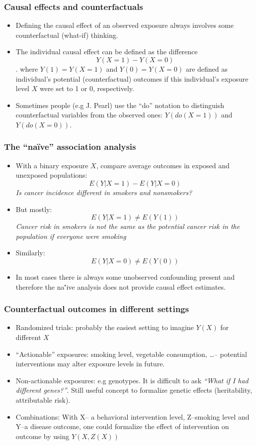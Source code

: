 \documentclass{beamer}
\begin{document}
\begin{frame}
\frametitle{Causal effects and counterfactuals}
\begin{itemize}
\item Defining the causal effect of an observed exposure always involves some \alert<1>{counterfactual} (what-if) thinking.
\item The individual causal effect can be defined as the difference 
 \[Y(X=1) - Y(X=0)\].
where $Y(1)=Y(X=1)$ and $Y(0)=Y(X=0)$ are defined as individual's \alert<2>{potential (counterfactual)} outcomes if this individual's exposure level $X$ were \alert<2>{set} to 1 or 0, respectively. 
\item Sometimes people (e.g J. Pearl) use the \alert<3>{``do''} notation to distinguish counterfactual variables from the observed ones: $Y(do(X=1))$ and $Y(do(X=0))$.     
\end{itemize}
\end{frame}

\begin{frame}
  \frametitle{The ``na\"ive'' association analysis}
  {\small  \begin{itemize}
  \item With a binary exposure $X$, compare average outcomes in exposed and unexposed populations:
  \[E(Y|X=1) - E(Y|X=0)\]
  \textit{Is cancer incidence different in smokers and nonsmokers?}
  \item But mostly:
  \[E(Y|X=1) \ne E(Y(1))\]
  \textit{Cancer risk in smokers is not the same as the potential cancer risk in the population if everyone were smoking}
  \item Similarly:
  \[E(Y|X=0) \ne E(Y(0))\]
  \item In most cases there is always some \alert{unobserved confounding} present and therefore the
   na\''ive analysis does not provide causal effect estimates.  
  \end{itemize}}
\end{frame}

\begin{frame}
\frametitle{Counterfactual outcomes in different settings}
\begin{itemize}
\item \alert<1>{Randomized trials}: probably the easiest setting to imagine $Y(X)$ for different $X$
\item \alert<2>{``Actionable'' exposures}: smoking level, vegetable consumption, \ldots -- potential interventions may alter exposure levels in future.
\item \alert<3>{Non-actionable exposures}: e.g genotypes. It is difficult to ask \emph{``What if I had different genes?''}. Still useful concept to formalize genetic effects (heritability, attributable risk).
\item \alert<4>{Combinations}: With X-- a behavioral intervention level, Z--smoking level and Y--a disease outcome, one could formalize the effect of intervention on outcome by using $Y(X, Z(X))$
\end{itemize}
\end{frame}
\end{document}
